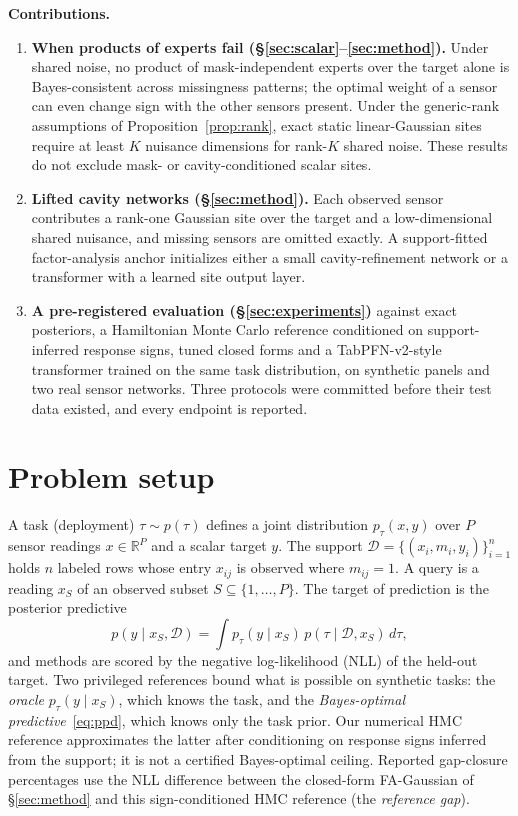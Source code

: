 \documentclass{article}
\newcommand{\R}{\mathbb{R}}
\newcommand{\D}{\mathcal{D}}
\begin{document}
\textbf{Contributions.}
\begin{enumerate}
  \item \textbf{When products of experts fail (\S\ref{sec:scalar}--\ref{sec:method}).} Under shared noise, no product
  of mask-independent experts over the target alone is Bayes-consistent across missingness patterns; the optimal
  weight of a sensor can even change sign with the other sensors present. Under the generic-rank assumptions of
  Proposition~\ref{prop:rank}, exact static linear-Gaussian sites require at least $K$ nuisance dimensions for rank-$K$
  shared noise. These results do not exclude mask- or cavity-conditioned scalar sites.
  \item \textbf{Lifted cavity networks (\S\ref{sec:method}).} Each observed sensor contributes a rank-one Gaussian
  site over the target and a low-dimensional shared nuisance, and missing sensors are omitted exactly. A support-fitted factor-analysis anchor
  initializes either a small cavity-refinement network or a transformer with a learned site output layer.
  \item \textbf{A pre-registered evaluation (\S\ref{sec:experiments})} against exact posteriors, a Hamiltonian Monte
  Carlo reference conditioned on support-inferred response signs, tuned closed forms and a TabPFN-v2-style transformer trained on the
  same task distribution, on synthetic panels and two real sensor networks. Three protocols were committed before
  their test data existed, and every endpoint is reported.
\end{enumerate}


\section{Problem setup}
\label{sec:setup}

A task (deployment) $\tau\sim p(\tau)$ defines a joint distribution $p_\tau(x,y)$ over $P$ sensor readings $x\in\R^P$
and a scalar target $y$. The support $\D=\{(x_i,m_i,y_i)\}_{i=1}^{n}$ holds $n$ labeled rows whose entry $x_{ij}$ is
observed where $m_{ij}=1$. A query is a reading $x_S$ of an observed subset $S\subseteq\{1,\dots,P\}$. The target of
prediction is the posterior predictive
\begin{equation}
  p(y\mid x_S,\D)=\int p_\tau(y\mid x_S)\,p(\tau\mid \D,x_S)\,d\tau ,
  \label{eq:ppd}
\end{equation}
and methods are scored by the negative log-likelihood (NLL) of the held-out target. Two privileged references bound
what is possible on synthetic tasks: the \emph{oracle} $p_\tau(y\mid x_S)$, which knows the task, and the
\emph{Bayes-optimal predictive}~\eqref{eq:ppd}, which knows only the task prior. Our numerical HMC reference
approximates the latter after conditioning on response signs inferred from the support; it is not a certified
Bayes-optimal ceiling. Reported gap-closure percentages use the NLL difference between the closed-form FA-Gaussian
of \S\ref{sec:method} and this sign-conditioned HMC reference (the \emph{reference gap}).
\end{document}
